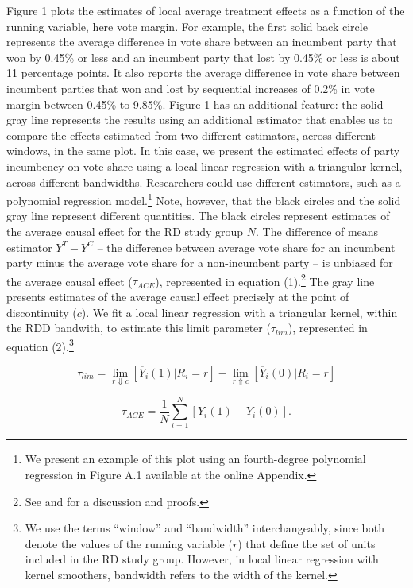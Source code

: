 \documentclass[letterpaper,twoside,12pt]{article}\usepackage[]{graphicx}\usepackage[]{color}
\begin{document}
Figure 1 plots the estimates of local average treatment effects as a function of the running variable, here vote margin. For example, the first solid back circle represents the average difference in vote share between an incumbent party that won by 0.45\% or less and an incumbent party that lost by 0.45\% or less is about 11 percentage points. It also reports the average difference in vote share between incumbent parties that won and lost by sequential increases of 0.2\% in vote margin between 0.45\% to 9.85\%. Figure 1 has an additional feature: the solid gray line represents the results using an additional estimator that enables us to compare the effects estimated from two different estimators, across different windows, in the same plot. In this case, we present the estimated effects of party incumbency on vote share using a local linear regression with a triangular kernel, across different bandwidths. Researchers could use different estimators, such as a polynomial regression model.\footnote{We present an example of this plot using an fourth-degree polynomial regression in Figure A.1 available at the online Appendix.} Note, however, that the black circles and the solid gray line represent different quantities. The black circles represent estimates of the average causal effect for the RD study group $N$. The difference of means estimator $Y^T - Y^C$ -- the difference between average vote share for an incumbent party minus the average vote share for a non-incumbent party -- is unbiased for the average causal effect ($\tau_{ACE}$), represented in equation (1).\footnote{See \citet{dunning2012natural} and \citet{buenodunningtunon2014} for a discussion and proofs.} The gray line presents estimates of the average causal effect precisely at the point of discontinuity ($c$). We fit a local linear regression with a triangular kernel, within the RDD bandwith, to estimate this limit parameter ($\tau_{lim}$), represented in equation (2).\footnote{We use the terms ``window'' and ``bandwidth'' interchangeably, since both denote the values of the running variable ($r$) that define the set of units included in the RD study group. However, in local linear regression with kernel smoothers, bandwidth refers to the width of the kernel.}

\begin{equation}\label{limit_parameter}
\tau_{lim} =  \lim_{r \Downarrow c}  [\overline{Y}_i(1)|R_i=r] - \lim_{r \Uparrow c} [\overline{Y}_i(0)|R_i=r]
  \end{equation}

\begin{equation}\label{local_parameter}
\tau_{ACE} = \frac{1}{N}\sum_{i=1}^{N} [Y_{i}(1)-Y_{i}(0)].
\end{equation}
\end{document}
